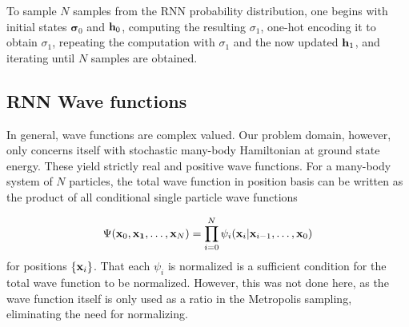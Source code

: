 To sample \(N\) samples from the RNN probability distribution, one begins with
initial states \(\bm{\sigma}_{0}\) and \(\vb{h}_{0}\), computing the resulting
\(\sigma_{1}\), one-hot encoding it to obtain \(\sigma_{1}\), repeating the
computation with \(\sigma_{1}\) and the now updated \(\vb{h}_{1}\), and
iterating until \(N\) samples are obtained.

\subsection{RNN Wave functions}

In general, wave functions are complex valued. Our problem domain, however,
only concerns itself with stochastic many-body Hamiltonian at ground state
energy. These yield strictly real and positive wave
functions\cite{Sharir_2020}. For a many-body system of \(N\) particles, the
total wave function in position basis can be written as the product of all conditional single particle wave
functions

\begin{equation*}
  \Psi(\vb{x}_{0}, \vb{x_{1}}, \ldots, \vb{x}_{N}) = \prod_{i=0}^{N}\psi_{i}(\vb{x}_{i}|\vb{x}_{i-1}, \ldots, \vb{x}_{0})
\end{equation*}
for positions \(\left\{  \vb{x}_{i}\right\}\). That each \(\psi_{i}\) is normalized is a
sufficient condition for the total wave function to be
normalized\cite{Sharir_2020}. However, this was not done here, as the wave
function itself is only used as a ratio in the Metropolis sampling, eliminating 
the need for normalizing.

